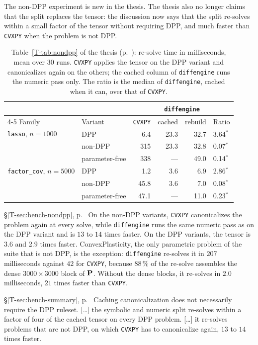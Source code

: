 \documentclass[letterpaper,12pt]{article}
\newcommand{\ac}[1]{#1}
\newcommand{\tsec}[1]{\S\ref{T-#1}}
\newcommand{\tpage}[1]{p.~\pageref{T-#1}}
\newcommand{\tref}[1]{\tsec{#1}, \tpage{#1}}
\begin{document}
The non-DPP experiment is new in the thesis. The thesis also no longer claims that the split
replaces the tensor: the discussion now says that the split re-solves within a small factor of
the tensor without requiring \ac{DPP}, and much faster than \texttt{CVXPY} when the problem is
not \ac{DPP}.

\begin{table}[htbp]
\centering
\caption{Table~\ref{T-tab:nondpp} of the thesis (\tpage{tab:nondpp}): re-solve time in
milliseconds, mean over $30$ runs. \texttt{CVXPY} applies the tensor on the DPP variant and
canonicalizes again on the others; the cached column of \texttt{diffengine} runs the numeric
pass only. The ratio is the median of \texttt{diffengine}, cached when it can, over that of
\texttt{CVXPY}.}\label{tab:res-nondpp}
{\small
\begin{tabular}{l l r rr l}
\toprule
& & & \multicolumn{2}{c}{\texttt{diffengine}} & \\
\cmidrule(lr){4-5}
Family & Variant & \texttt{CVXPY} & cached & rebuild & Ratio \\
\midrule
\texttt{lasso}, $n = 1000$         & \ac{DPP}        & 6.4 & 23.3 & 32.7 & 3.64$^{*}$ \\
                                   & non-\ac{DPP}    & 315 & 23.3 & 32.8 & 0.07$^{*}$ \\
                                   & parameter-free  & 338 & --- & 49.0 & 0.14$^{*}$ \\
\addlinespace
\texttt{factor\_cov}, $n = 5000$   & \ac{DPP}        & 1.2 & 3.6 & 6.9 & 2.86$^{*}$ \\
                                   & non-\ac{DPP}    & 45.8 & 3.6 & 7.0 & 0.08$^{*}$ \\
                                   & parameter-free  & 47.1 & --- & 11.0 & 0.23$^{*}$ \\
\bottomrule
\end{tabular}}
\end{table}

\begin{thesisquote}{\tref{sec:bench-nondpp}}
On the non-\ac{DPP} variants, \texttt{CVXPY} canonicalizes the problem again at every solve,
while \texttt{diffengine} runs the same numeric pass as on the \ac{DPP} variant and is $13$
to $14$ times faster. On the \ac{DPP} variants, the tensor is $3.6$ and $2.9$ times faster.
ConvexPlasticity, the only parametric problem of the suite that is not \ac{DPP}, is the
exception: \texttt{diffengine} re-solves it in $207$ milliseconds against $42$ for
\texttt{CVXPY}, because $88\,\%$ of the re-solve assembles the dense $3000 \times 3000$ block
of $\mathbf{P}$. Without the dense blocks, it re-solves in $2.0$ milliseconds, $21$ times faster
than \texttt{CVXPY}.
\end{thesisquote}
\begin{thesisquote}{\tref{sec:bench-summary}}
Caching canonicalization does not necessarily require the \ac{DPP} ruleset. [\ldots] the
symbolic and numeric split re-solves within a factor of four of the cached tensor on every
\ac{DPP} problem. [\ldots] it re-solves problems that are not \ac{DPP}, on which
\texttt{CVXPY} has to canonicalize again, $13$ to $14$ times faster.
\end{thesisquote}
\end{document}
